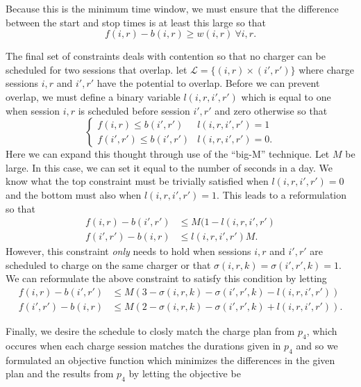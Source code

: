 \par Because this is the minimum time window, we must ensure that the difference between the start and stop times is at least this large so that
\begin{equation}\label{eqn:assignment:eqn4}
	f(i,r) - b(i,r) \ge w(i,r) \ \forall i,r.
\end{equation}
\par The final set of constraints deals with contention so that no charger can be scheduled for two sessions that overlap. let $\mathcal{L} = \{(i,r)\times (i',r') \}$ where charge sessions $i,r$ and $i',r'$ have the potential to overlap. Before we can prevent overlap, we must define a binary variable $l(i,r,i',r')$ which is equal to one when session $i,r$ is scheduled before session $i',r'$ and zero otherwise so that
\begin{equation}
	\begin{cases}
		f(i,r) \le b(i',r') & l(i,r,i',r') = 1 \\
		f(i',r') \le b(i',r') & l(i,r,i',r') = 0. 
	\end{cases}
\end{equation}
Here we can expand this thought through use of the ``big-M'' technique.  Let $M$ be large. In this case, we can set it equal to the number of seconds in a day. We know what the top constraint must be trivially satisfied when $l(i,r,i',r') = 0$ and the bottom must also when $l(i,r,i',r') = 1$.  This leads to a reformulation so that
\begin{equation*}\begin{aligned}
		f(i,r) - b(i',r') & \le M(1 - l(i,r,i',r')\\
		f(i',r') - b(i,r) & \le l(i,r,i',r')M.  
\end{aligned}\end{equation*}
However, this constraint {\it only} needs to hold when sessions $i,r$ and $i',r'$ are scheduled to charge on the same charger or that $\sigma(i,r,k) = \sigma(i',r',k) = 1$. We can reformulate the above constraint to satisfy this condition by letting
\begin{equation}\label{eqn:assignment:eqn5}\begin{aligned}
	f(i,r) - b(i',r') & \le M(3 - \sigma(i,r,k) - \sigma(i',r',k) - l(i,r,i',r')) \\
	f(i',r') - b(i,r) & \le M(2 - \sigma(i,r,k) - \sigma(i',r',k) + l(i,r,i',r')).
\end{aligned}\end{equation}
\par Finally, we desire the schedule to closly match the charge plan from $p_4$, which occures when each charge session matches the durations given in $p_4$ and so we formulated an objective function which minimizes the differences in the given plan and the results from $p_4$ by letting the objective be
